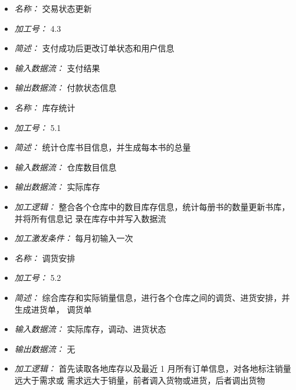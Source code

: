 \vspace{-1mm}


\begin{itemize}
\item \textit{名称： } 交易状态更新
\item \textit{加工号： } 4.3
\item \textit{简述： } 支付成功后更改订单状态和用户信息 
\item \textit{输入数据流： } 支付结果
\item \textit{输出数据流： } 付款状态信息

\end{itemize}


\vspace{-1mm}


\begin{itemize}
\item \textit{名称： } 库存统计
\item \textit{加工号： }5.1 
\item \textit{简述： }统计仓库书目信息，并生成每本书的总量
\item \textit{输入数据流： } 仓库数目信息
\item \textit{输出数据流： } 实际库存 
\item \textit{加工逻辑： }整合各个仓库中的数目库存信息，统计每册书的数量更新书库，并将所有信息记 录在库存中并写入数据流
\item \textit{加工激发条件： } 每月初输入一次

\end{itemize}


\vspace{-1mm}


\begin{itemize}
\item \textit{名称： }调货安排
\item \textit{加工号： }5.2
\item \textit{简述： } 综合库存和实际销量信息，进行各个仓库之间的调货、进货安排，并生成进货单， 调货单
\item \textit{输入数据流： } 实际库存，调动、进货状态
\item \textit{输出数据流： } 无
\item \textit{加工逻辑： } 首先读取各地库存以及最近 1 月所有订单信息，对各地标注销量远大于需求或 需求远大于销量，前者调入货物或进货，后者调出货物

\end{itemize}


\vspace{-1mm}


